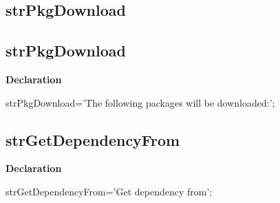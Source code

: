 \documentclass{report}
\newif\ifpdf
\begin{document}
\subsection*{\large{\textbf{strPkgDownload}}\normalsize\hspace{1ex}\hrulefill}
\else
\subsection*{strPkgDownload}
\fi
\label{trstrings-strPkgDownload}
\begin{list}{}{
\setlength{\itemindent}{0cm}
\setlength{\listparindent}{0cm}
\setlength{\leftmargin}{\evensidemargin}
\addtolength{\leftmargin}{\tmplength}
\settowidth{\labelsep}{X}
\addtolength{\leftmargin}{\labelsep}
\setlength{\labelwidth}{\tmplength}
}
\item[\textbf{Declaration}\hfill]
\ifpdf
\begin{flushleft}
\fi
\begin{ttfamily}
strPkgDownload='The following packages will be downloaded:';\end{ttfamily}

\ifpdf
\end{flushleft}
\fi

\end{list}
\ifpdf
\subsection*{\large{\textbf{strGetDependencyFrom}}\normalsize\hspace{1ex}\hrulefill}
\else
\subsection*{strGetDependencyFrom}
\fi
\label{trstrings-strGetDependencyFrom}
\begin{list}{}{
\setlength{\itemindent}{0cm}
\setlength{\listparindent}{0cm}
\setlength{\leftmargin}{\evensidemargin}
\addtolength{\leftmargin}{\tmplength}
\settowidth{\labelsep}{X}
\addtolength{\leftmargin}{\labelsep}
\setlength{\labelwidth}{\tmplength}
}
\item[\textbf{Declaration}\hfill]
\ifpdf
\begin{flushleft}
\fi
\begin{ttfamily}
strGetDependencyFrom='Get dependency from';\end{ttfamily}

\ifpdf
\end{flushleft}
\fi

\end{list}
\ifpdf
\end{document}
